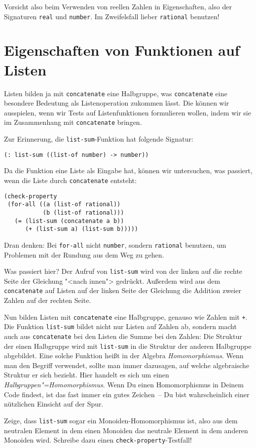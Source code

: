 Vorsicht also beim Verwenden von reellen Zahlen in Eigenschaften, also
der Signaturen \lstinline{real} und \lstinline{number}.  Im
Zweifelsfall lieber \lstinline{rational} benutzen!

\section{Eigenschaften von Funktionen auf Listen}

Listen bilden ja mit \lstinline{concatenate} eine Halbgruppe, was
\lstinline{concatenate} eine besondere Bedeutung als Listenoperation
zukommen lässt.  Die können wir ausspielen, wenn wir Tests auf
Listenfunktionen formulieren wollen, indem wir sie im Zusammenhang mit
\lstinline{concatenate} bringen.

Zur Erinnerung, die \lstinline{list-sum}-Funktion hat folgende
Signatur:
%
\begin{lstlisting}
(: list-sum ((list-of number) -> number))
\end{lstlisting}
%
Da die Funktion eine Liste als Eingabe hat, können wir untersuchen,
was passiert, wenn die Liste durch \lstinline{concatenate} entsteht:
%
\begin{lstlisting}
(check-property
 (for-all ((a (list-of rational))
           (b (list-of rational)))
   (= (list-sum (concatenate a b))
      (+ (list-sum a) (list-sum b)))))
\end{lstlisting}
%
Dran denken: Bei \lstinline{for-all} nicht \lstinline{number},
sondern \lstinline{rational} benutzen, um Problemen mit der Rundung
aus dem Weg zu gehen.

Was passiert hier?  Der Aufruf von \lstinline{list-sum} wird von der
linken auf die rechte Seite der Gleichung "<nach innen"> gedrückt.
Außerdem wird aus dem \lstinline{concatenate} auf Listen auf der
linken Seite der Gleichung die Addition zweier Zahlen auf der rechten
Seite.

Nun bilden Listen mit \lstinline{concatenate} eine Halbgruppe, genauso
wie Zahlen mit \lstinline{+}. Die Funktion \lstinline{list-sum} bildet
nicht nur Listen auf Zahlen ab, sondern macht auch aus
\lstinline{concatenate} bei den Listen die Summe bei den Zahlen:
Die Struktur der einen Halbgruppe wird mit \lstinline{list-sum} in die
Struktur der anderen Halbgruppe abgebildet.  Eine solche Funktion heißt in
der Algebra \textit{Homomorphismus}. Wenn man
den Begriff verwendet, sollte man immer dazusagen, auf welche
algebraische Struktur er sich bezieht.  Hier handelt es sich um einen
\textit{Halbgruppen"=Homomorphismus}.  Wenn Du einen Homomorphismus in
Deinem Code findest, ist das fast immer ein gutes Zeichen~-- Du bist
wahrscheinlich einer nützlichen Einsicht auf der Spur.
%
\begin{aufgabeinline}
  Zeige, dass \lstinline{list-sum} sogar ein Monoiden-Homomorphismus
  ist, also aus dem neutralen Element in dem einen Monoiden das
  neutrale Element in dem anderen Monoiden wird.  Schreibe dazu einen
  \lstinline{check-property}-Testfall!
\end{aufgabeinline}

